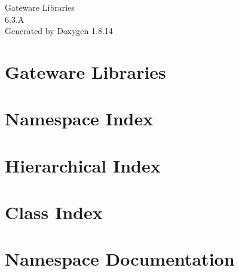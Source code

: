 \documentclass[twoside]{book}
\newcommand{\+}{\discretionary{\mbox{\scriptsize$\hookleftarrow$}}{}{}}
\newcommand{\clearemptydoublepage}{%
  \newpage{\pagestyle{empty}\cleardoublepage}%
}
\begin{document}
\hypersetup{pageanchor=false,
             bookmarksnumbered=true,
             pdfencoding=unicode
            }
\begin{titlepage}
\vspace*{7cm}
\begin{center}%
{\Large Gateware Libraries \\[1ex]\large 6.\+3.\+A }\\
\vspace*{1cm}
{\large Generated by Doxygen 1.8.14}\\
\end{center}
\end{titlepage}
\clearemptydoublepage
{}
\tableofcontents
\clearemptydoublepage
{}
\hypersetup{pageanchor=true}

\chapter{Gateware Libraries}
\label{index}\hypertarget{index}{}
\chapter{Namespace Index}

\chapter{Hierarchical Index}

\chapter{Class Index}

\chapter{Namespace Documentation}






\end{document}
